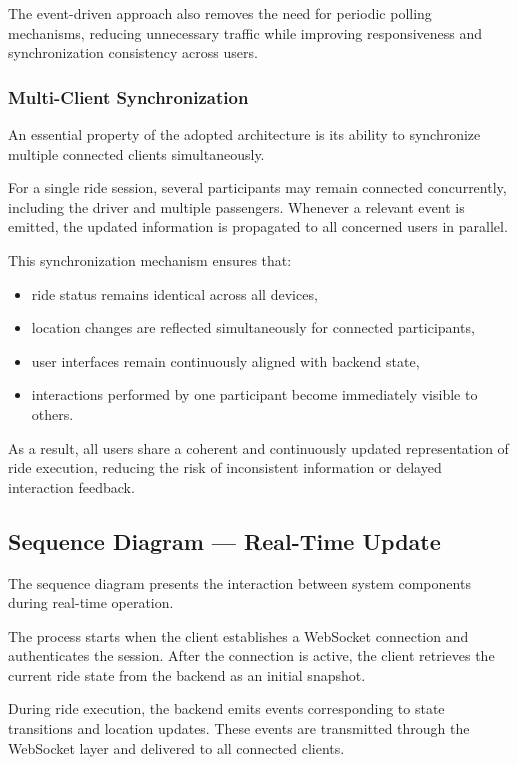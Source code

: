 The event-driven approach also removes the need for periodic polling mechanisms, reducing unnecessary traffic while improving responsiveness and synchronization consistency across users.


\subsubsection{Multi-Client Synchronization}

An essential property of the adopted architecture is its ability to synchronize multiple connected clients simultaneously.

For a single ride session, several participants may remain connected concurrently, including the driver and multiple passengers. Whenever a relevant event is emitted, the updated information is propagated to all concerned users in parallel.

This synchronization mechanism ensures that:

\begin{itemize}
    \item ride status remains identical across all devices,
    \item location changes are reflected simultaneously for connected participants,
    \item user interfaces remain continuously aligned with backend state,
    \item interactions performed by one participant become immediately visible to others.
\end{itemize}

As a result, all users share a coherent and continuously updated representation of ride execution, reducing the risk of inconsistent information or delayed interaction feedback.
\subsection{Sequence Diagram — Real-Time Update}

The sequence diagram presents the interaction between system components during real-time operation.

The process starts when the client establishes a WebSocket connection and authenticates the session. After the connection is active, the client retrieves the current ride state from the backend as an initial snapshot.

During ride execution, the backend emits events corresponding to state transitions and location updates. These events are transmitted through the WebSocket layer and delivered to all connected clients.

